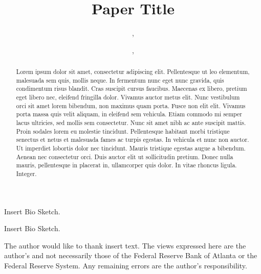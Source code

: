 \documentclass{frbaart}
\title{Paper Title}
\begin{document}



\begin{abstract}
  Lorem ipsum dolor sit amet, consectetur adipiscing
  elit. Pellentesque ut leo elementum, malesuada sem quis, mollis
  neque. In fermentum nunc eget nunc gravida, quis condimentum risus
  blandit. Cras suscipit cursus faucibus. Maecenas ex libero, pretium
  eget libero nec, eleifend fringilla dolor. Vivamus auctor metus
  elit. Nunc vestibulum orci sit amet lorem bibendum, non maximus quam
  porta. Fusce non elit elit. Vivamus porta massa quis velit aliquam,
  in eleifend sem vehicula. Etiam commodo mi semper lacus ultricies,
  sed mollis sem consectetur. Nunc sit amet nibh ac ante suscipit
  mattis. Proin sodales lorem eu molestie tincidunt. Pellentesque
  habitant morbi tristique senectus et netus et malesuada fames ac
  turpis egestas. In vehicula et nunc non auctor. Ut imperdiet
  lobortis dolor nec tincidunt. Mauris tristique egestas augue a
  bibendum. Aenean nec consectetur orci. Duis auctor elit ut
  sollicitudin pretium. Donec nulla mauris, pellentesque in placerat
  in, ullamcorper quis dolor. In vitae rhoncus ligula. Integer.
\end{abstract}

\author{
  , %
}

\author{
  , %
}

%
%
\begin{findings}
\item
  \lipsum[1][1]
\item
  \lipsum[1][2]
  
\end{findings}

\affil{\lipsum[1][3]}


\maketitle

\begin{aboutauthors}
  Insert Bio Sketch.

  Insert Bio Sketch.
\end{aboutauthors}
%
%
\begin{acks}
  The author would like to thank  insert text.
  The views expressed here are the author’s and not necessarily those of the
  Federal Reserve Bank of Atlanta or the Federal Reserve System.
  Any remaining errors are the author's responsibility.
\end{acks}
\end{document}
